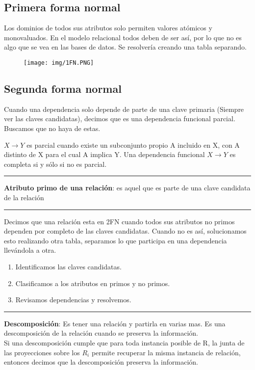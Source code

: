 \subsection*{Primera forma normal}
Los dominios de todos sus atributos solo permiten valores atómicos y monovaluados. En el modelo relacional todos deben de ser así, por lo que no es algo que se vea en las bases de datos.
Se resolvería creando una tabla separando.

\begin{figure}[!htb]
    \centering
    \texttt{[image: img/1FN.PNG]}
\end{figure}


\subsection*{Segunda forma normal}
Cuando una dependencia solo depende de parte de una clave primaria (Siempre ver las claves candidatas), decimos que es una dependencia funcional parcial. Buscamos que no haya de estas.

\medskip
$X\rightarrow Y$ es parcial cuando existe un subconjunto propio A incluido en X, con A distinto de X para el cual A implica Y. Una dependencia funcional $X \rightarrow Y$ es completa si y sólo si no es
parcial.

\noindent\rule{\textwidth}{0.5pt}
\textbf{Atributo primo de una relación}: es aquel que es parte de una clave candidata de la relación\\
\noindent\rule{\textwidth}{0.5pt}

\medskip
Decimos que una relación esta en 2FN cuando todos sus atributos no primos dependen por completo de las claves candidatas. Cuando no es así, solucionamos esto realizando otra tabla, separamos lo que participa en una dependencia llevándola a otra.
\begin{enumerate}
\item Identificamos las claves candidatas.
\item Clasificamos a los atributos en primos y no primos.
\item Revisamos dependencias y resolvemos.
\end{enumerate}


\noindent\rule{\textwidth}{0.5pt}
\textbf{Descomposición}: Es tener una relación y partirla en varias mas. Es una descomposición de la relación cuando se preserva la información.\\

Si una descomposición cumple que para toda instancia posible de
R, la junta de las proyecciones sobre los $R_i$ permite recuperar la
misma instancia de relación, entonces decimos que la
descomposición preserva la información.


